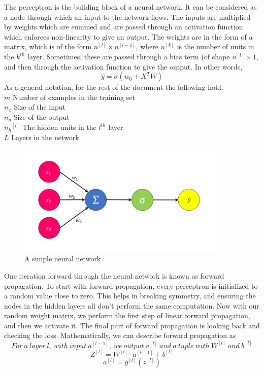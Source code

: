 \documentclass{article}
\begin{document}
The perceptron is the building block of a neural network. It can be considered as a node through which an input to the network flows. The inputs are multiplied by weights which are summed and are passed through an activation function which enforces non-linearity to give an output. The weights are in the form of a matrix, which is of the form $n^{[l]} \times n^{[l-1]}$, where $n^{[k]}$ is the number of units in the $k^{th}$ layer. Sometimes, these are passed through a bias term (of shape $n^{[l]} \times 1$, and then through the activation function to give the output. In other words,
$$\widehat{y} = \sigma(w_0 + X^TW)$$
As a general notation, for the rest of the document the following hold.\\
$m$ Number of examples in the training set\\
$n_x$ Size of the input\\
$n_y$ Size of the output\\
${n_h}^{[l]}$ The hidden units in the $l^{th}$ layer\\
$L$ Layers in the network

\begin{figure}[h]
\includegraphics[width=10cm]{Images/perceptron.png}
\centering
\caption{A simple neural network}
\end{figure}

One iteration forward through the neural network is known as forward propagation. To start with forward propagation, every perceptron is initialized to a random value close to zero. This helps in breaking symmetry, and ensuring the nodes in the hidden layers all don't perform the same computation. Now with our random weight matrix, we perform the first step of linear forward propagation, and then we activate it. The final part of forward propagation is looking back and checking the loss. Mathematically, we can describe forward propagation as
$$ For\ a\ layer\ l,\ with\ input\ a^{[l-1]},\ we\ output\ a^{[l]}\ and\ a\ tuple\ with\ W^{[l]}\ and\ b^{[l]} $$
$$ Z^{[l]} = W^{[l]} \cdot a^{[l-1]} + b^{[l]} $$
$$ a^{[l]} = g^{[l]} (z^{[l]}) $$
\end{document}
